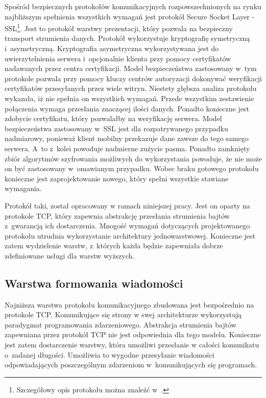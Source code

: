 Spośród bezpiecznych protokołów komunikacyjnych rozpowszechnionych na
rynku najbliższym spełnienia wszystkich wymagań jest protokół Secure
Socket Layer - SSL\footnote{Szczegółowy opis protokołu można znaleźć
  w~\cite[148-155]{book:kryptografia}.}. Jest to protokół warstwy
prezentacji, który pozwala na bezpieczny transport strumienia
danych. Protokół wykorzystuje kryptografię symetryczną
i~asymetryczną. Kryptografia asymetryczna wykorzystywana jest do
uwierzytelnienia serwera i~opcjonalnie klienta przy pomocy
certyfikatów nadawanych przez centra certyfikacji. Model
bezpieczeństwa zastosowany w~tym protokole pozwala przy pomocy kluczy
centrów autoryzacji dokonywać weryfikacji certyfikatów przesyłanych
przez wiele witryn. Niestety głębsza analiza protokołu wykazała, iż
nie spełnia on wszystkich wymagań. Przede wszystkim zestawienie
połączenia wymaga przesłania znaczącej ilości danych. Ponadto
konieczne jest zdobycie certyfikatu, który pozwalałby na weryfikację
serwera. Model bezpieczeństwa zastosowany w~SSL jest dla
rozpatrywanego przypadku nadmiarowy, ponieważ klient mobilny
przekazuje dane zawsze do tego samego serwera.  A~to z~kolei powoduje
nadmierne zużycie pasma. Ponadto zamknięty zbiór algorytmów
szyfrowania możliwych do wykorzystania powoduje, że nie może on być
zastosowany w~omawianym przypadku. Wobec braku gotowego protokołu
konieczne jest zaprojektowanie nowego, który spełni wszystkie stawiane
wymagania.

Protokół taki, został opracowany w ramach niniejszej pracy. Jest on
oparty na protokole TCP, który zapewnia abstrakcję przesłania
strumienia bajtów z~gwarancją ich dostarczenia. Mnogość wymagań
dotyczących projektowanego protokołu utrudnia wykorzystanie
architektury jednowarstwowej. Konieczne jest zatem wydzielenie warstw,
z~których każda będzie zapewniała dobrze zdefiniowane usługi dla
warstw wyższych.
 

\subsection[Warstwa formowania wiadomości][Warstwa formowania wiadomości]{Warstwa formowania wiadomości}

Najniższa warstwa protokołu komunikacyjnego zbudowana jest
bezpośrednio na protokole TCP. Komunikujące się strony w swej
architekturze wykorzystują paradygmat programowania
zdarzeniowego. Abstrakcja strumienia bajtów zapewniana przez protokół
TCP nie jest odpowiednia dla tego modelu. Konieczne jest zatem
dostarczenie warstwy, która umożliwi przesłanie w całości komunikatu
o~zadanej długości. Umożliwia to wygodne przesyłanie wiadomości
odpowiadających poszczególnym zdarzeniom w~komunikujących się
programach.

